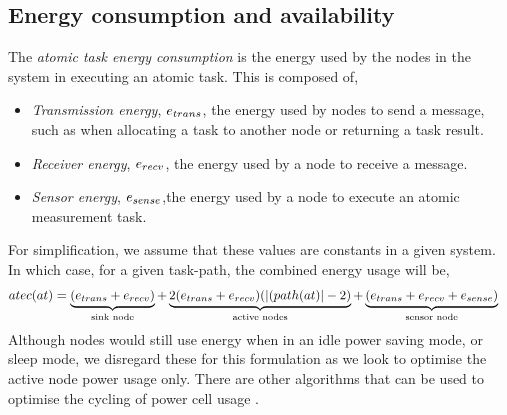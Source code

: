 \subsection{Energy consumption and availability}
The \textit{atomic task energy consumption} is the energy used by the nodes in the system in executing an atomic task. This is composed of,
 \begin{itemize}
 	\item \textit{Transmission energy}, $e_{trans}$, the energy used by nodes to  send a message, such as when allocating a task to another node or returning a task result. 
 	\item \textit{Receiver energy}, $e_{recv}$, the energy used by a node to receive a message. 
 	 \item \textit{Sensor energy}, $e_{sense}$,the energy used by a node to execute an atomic measurement task.
 \end{itemize}
For simplification, we assume that these values are constants in a given system. In which case, for a given task-path, the combined energy usage will be,
\begin{align}
\functionAtomicTaskEnergyConsumptionSignature{}{} 
&= 
\underbrace{(\varTransmissionEnergy{}{} + \varReceiverEnergy{}{})}_{\text{sink node}}
+ \underbrace{
	2 (\varTransmissionEnergy{}{} + \varReceiverEnergy{}{})
 	(\funcSize{(\functionTaskArc{}{}}{} -2)
}_{\text{active nodes}}
+ \underbrace{
	 (
	 	\varTransmissionEnergy{}{}
	 	+ \varReceiverEnergy{}{}
	 	+ \varSensorEnergy{}{}
	 )
 }_{\text{sensor node}}  
\end{align}
Although nodes would still use energy when in an idle power saving mode, or sleep mode, we disregard these for this formulation as we look to optimise the active node power usage only. There are other algorithms that can be used to optimise the cycling of power cell usage \citep{Escolar2014}.

\newcommand{\formalAgentEnergyAvailable}[2]{
	\functionFormal{fae}
	{\setAgents{}{}}
	{\setRealNumbersUnit{}{}}
}
\newcommand{\functionAgentEnergyAvailable}[2]{
	\functionSignature{fae_{\varTime{}{}}}
	{\varAgent{}{}}
}
\newcommand{\functionEnergyVariability}[2]{
	\ifx \\#1\\
	\functionSignature{rev_{\varTime{}{}}}
	{\setAgents{}{}}
	\else
	\functionSignature{rev_{\varTime{}{}}}{#1}
	\fi
}

